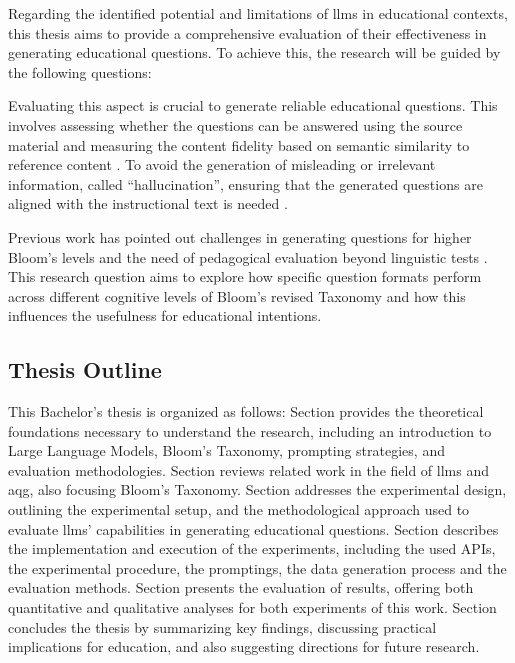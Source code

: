Regarding the identified potential and limitations of \ac{llms} in educational contexts, this thesis aims to provide a comprehensive evaluation of their effectiveness in generating educational questions. To achieve this, the research will be guided by the following questions:

 Evaluating this aspect is crucial to generate reliable educational questions. This involves assessing whether the questions can be answered using the source material \cite{maity_can_2025,moore_assessing_2022,scaria_automated_2024} and measuring the content fidelity based on semantic similarity to reference content \cite{li_planning_2024}. To avoid the generation of misleading or irrelevant information, called \enquote{hallucination}, ensuring that the generated questions are aligned with the instructional text is needed \cite{al_faraby_analysis_2024}.

 Previous work has pointed out challenges in generating questions for higher Bloom's levels \cite{scaria_automated_2024} and the need of pedagogical evaluation beyond linguistic tests \cite{horbach_linguistic_2020,steuer_i_2021}. This research question aims to explore how specific question formats perform across different cognitive levels of Bloom's revised Taxonomy \cite{krathwohl_revision_2002} and how this influences the usefulness for educational intentions.


\subsection{Thesis Outline}

This Bachelor's thesis is organized as follows:
Section  provides the theoretical foundations necessary to understand the research, including an introduction to Large Language Models, Bloom's Taxonomy, prompting strategies, and evaluation methodologies.
Section  reviews related work in the field of \ac{llms} and \ac{aqg}, also focusing Bloom's Taxonomy.
Section  addresses the experimental design, outlining the experimental setup, and the methodological approach used to evaluate \ac{llms}' capabilities in generating educational questions.
Section  describes the implementation and execution of the experiments, including the used APIs, the experimental procedure, the promptings, the data generation process and the evaluation methods.
Section  presents the evaluation of results, offering both quantitative and qualitative analyses for both experiments of this work.
Section  concludes the thesis by summarizing key findings, discussing practical implications for education, and also suggesting directions for future research.
